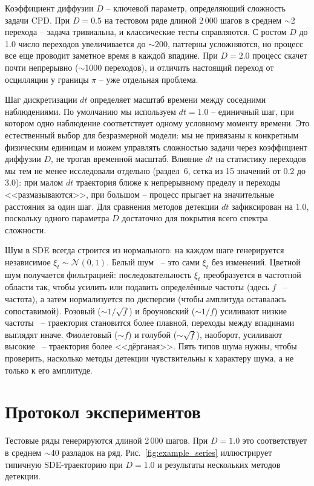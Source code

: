 \documentclass[12pt,a4paper]{article}
\begin{document}
Коэффициент диффузии $D$ -- ключевой параметр, определяющий сложность задачи CPD. При $D = 0.5$ на тестовом ряде длиной 2\,000 шагов в среднем $\sim$2 перехода -- задача тривиальна, и классические тесты справляются. С ростом $D$ до 1.0 число переходов увеличивается до $\sim$200, паттерны усложняются, но процесс все еще проводит заметное время в каждой впадине. При $D = 2.0$ процесс скачет почти непрерывно ($\sim$1000 переходов), и отличить настоящий переход от осцилляции у границы $\pi$ -- уже отдельная проблема.

Шаг дискретизации $dt$ определяет масштаб времени между соседними наблюдениями. По умолчанию мы используем $dt = 1.0$  -- единичный шаг, при котором одно наблюдение соответствует одному условному моменту времени. Это естественный выбор для безразмерной модели: мы не привязаны к конкретным физическим единицам и можем управлять сложностью задачи через коэффициент диффузии $D$, не трогая временной масштаб. Влияние $dt$ на статистику переходов мы тем не менее исследовали отдельно (раздел~6, сетка из 15 значений от 0.2 до 3.0): при малом $dt$ траектория ближе к непрерывному пределу и переходы <<размазываются>>, при большом  -- процесс прыгает на значительные расстояния за один шаг. Для сравнения методов детекции $dt$ зафиксирован на 1.0, поскольку одного параметра $D$ достаточно для покрытия всего спектра сложности.

Шум в SDE всегда строится из нормального: на каждом шаге генерируется независимое $\xi_t \sim \mathcal{N}(0,1)$. Белый шум~ -- это сами $\xi_t$ без изменений. Цветной шум получается фильтрацией: последовательность $\xi_t$ преобразуется в частотной области так, чтобы усилить или подавить определённые частоты (здесь $f$~ -- частота), а затем нормализуется по дисперсии (чтобы амплитуда оставалась сопоставимой). Розовый ($\sim 1/\sqrt{f}$) и броуновский ($\sim 1/f$) усиливают низкие частоты~ -- траектория становится более плавной, переходы между впадинами выглядят иначе. Фиолетовый ($\sim f$) и голубой ($\sim \sqrt{f}$), наоборот, усиливают высокие~ -- траектория более <<дёрганая>>. Пять типов шума нужны, чтобы проверить, насколько методы детекции чувствительны к характеру шума, а не только к его амплитуде.


\section{Протокол экспериментов}

Тестовые ряды генерируются длиной 2\,000 шагов. При $D = 1.0$ это соответствует в среднем $\sim$40 разладок на ряд. Рис.~\ref{fig:example_series} иллюстрирует типичную SDE-траекторию при $D = 1.0$ и результаты нескольких методов детекции.
\end{document}
